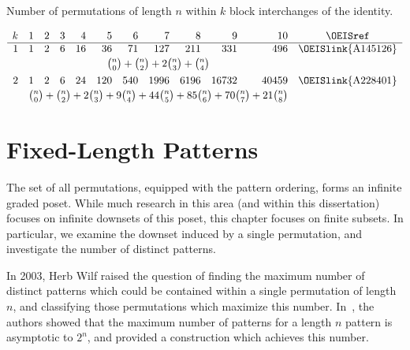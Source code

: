 \documentclass[12pt,twoside]{memoir}
\begin{document}
      \begin{table}[t]
      \caption{Number of permutations of length $n$ within $k$ block interchanges of the
      identity.}
      \begin{footnotesize}
      $$
      \begin{array}{rrrrrrrrrrrc}
      k &1&2&3&4&5&6&7&8&9&10&\text{\OEISref}\\\hline
      1&1&2&6&16&36&71&127&211&331&496&\text{\OEISlink{A145126}}\\[0.5ex]
      &\multicolumn{10}{c}{{n\choose 0}+{n\choose 2}+2{n\choose 3}+{n\choose
      4}}&\\[1ex]
      2&1&2&6&24&120&540&1996&6196&16732&40459&\text{\OEISlink{A228401}}\\[0.5ex]
      &\multicolumn{10}{c}{{n\choose 0}+{n\choose 2}+2{n\choose 3}+9{n\choose
      4}+44{n\choose 5}+85{n\choose 6}+70{n\choose 7}+21{n\choose 8}}&\\
      \end{array}
      $$
      \end{footnotesize}
      \end{table}




\cleardoublepage
\typeout{******************}
\typeout{******************}


  \chapter{Fixed-Length Patterns}
  \label{chap:fixpat}


    The set of all permutations, equipped with the pattern ordering, forms an
    infinite graded poset. While much research in this area (and within this
    dissertation) focuses on infinite downsets of this poset, this chapter focuses
    on finite subsets. In particular, we examine the downset induced by a single
    permutation, and investigate the number of distinct patterns. 
    

    In 2003, Herb Wilf raised the question of finding the maximum number of
    distinct patterns which could be contained within a single permutation of
    length $n$, and classifying those permutations which maximize this number. 
    In~\cite{Flynn2007}, the authors showed that the maximum number of patterns
    for a length $n$ pattern is asymptotic to $2^n$, and provided a construction
    which achieves this number. 
\end{document}
